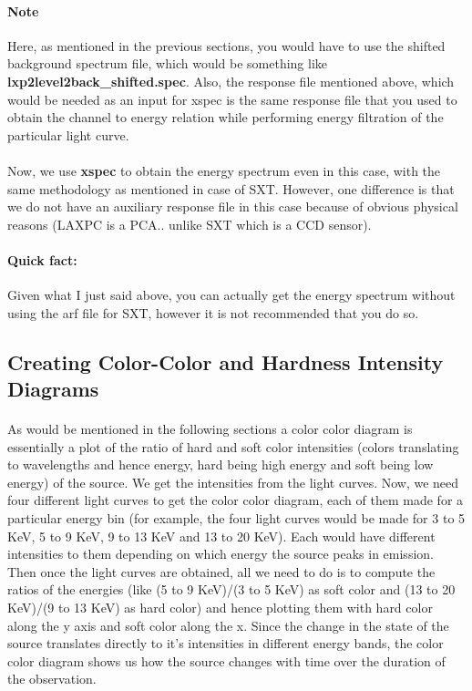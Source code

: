 \documentclass[a4paper,twoside]{report}
\numberwithin{equation}{section}
\begin{document}
\paragraph{Note} Here, as mentioned in the previous sections, you would have to use the shifted background spectrum file, which would be something like \textbf{lxp2level2back\_shifted.spec}. Also, the response file mentioned above, which would be needed as an input for xspec is the same response file that you used to obtain the channel to energy relation while performing energy filtration of the particular light curve. 
\paragraph{}
Now, we use \textbf{xspec} to obtain the energy spectrum even in this case, with the same methodology as mentioned in case of SXT. However, one difference is that we do not have an auxiliary response file in this case because of obvious physical reasons (LAXPC is a PCA.. unlike SXT which is a CCD sensor). 
\paragraph{Quick fact:}
Given what I just said above, you can actually get the energy spectrum without using the arf file for SXT, however it is not recommended that you do so. 
\subsection{Creating Color-Color and Hardness Intensity Diagrams}
\paragraph{}
As would be mentioned in the following sections a color color diagram is essentially a plot of the ratio of hard and soft color intensities (colors translating to wavelengths and hence energy, hard being high energy and soft being low energy) of the source. We get the intensities from the light curves. Now, we need four different light curves to get the color color diagram, each of them made for a particular energy bin (for example, the four light curves would be made for 3 to 5 KeV, 5 to 9 KeV, 9 to 13 KeV and 13 to 20 KeV). Each would have different intensities to them depending on which energy the source peaks in emission. Then once the light curves are obtained, all we need to do is to compute the ratios of the energies (like (5 to 9 KeV)/(3 to 5 KeV) as soft color and (13 to 20 KeV)/(9 to 13 KeV) as hard color) and hence plotting them with hard color along the y axis and soft color along the x. Since the change in the state of the source translates directly to it's intensities in different energy bands, the color color diagram shows us how the source changes with time over the duration of the observation. 
\end{document}
